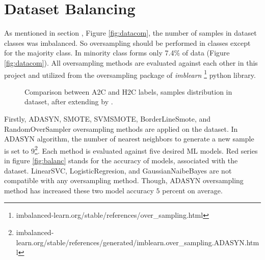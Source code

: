 \section{Dataset Balancing}
As mentioned in section , Figure \ref{fig:datacom}, the number of samples in dataset classes was imbalanced. So oversampling should be performed in classes except for the majority class.
In \cite{stance_persian} minority class forms only 7.4\% of data (Figure \ref{fig:datacom}).
 All oversampling methods are evaluated against each other in this project and utilized from the oversampling package of \textit{imblearn} \footnote{imbalanced-learn.org/stable/references/over\_sampling.html} python library. 

\begin{figure}%
	\centering
	\qquad
	\caption{Comparison between \ac{A2C} and \ac{H2C} labels, samples distribution in \cite{stance_persian} dataset, after extending by \cite{parsfever} .}%
	\label{fig:datab1}%
\end{figure}



Firstly, \ac{ADASYN}, SMOTE, SVMSMOTE, BorderLineSmote, and RandomOverSampler oversampling methods are applied on the \cite{stance_persian} dataset. In \ac{ADASYN} algorithm, the number of nearest neighbors to generate a new sample is set to 9\footnote{imbalanced-learn.org/stable/references/generated/imblearn.over\_sampling.ADASYN.html}. Each method is evaluated against five desired \ac{ML} models. Red series in figure \ref{fig:balanc} stands for the accuracy of models, associated with the \cite{stance_persian} dataset. LinearSVC, LogisticRegresion, and GaussianNaibeBayes are not compatible with any oversampling method. Though, \ac{ADASYN} oversampling method has increased these two model accuracy $5$ percent on average.


